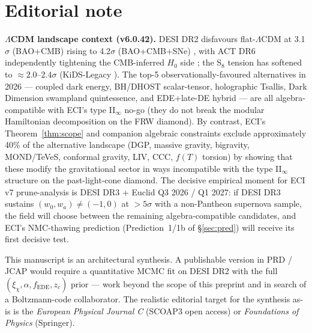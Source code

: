 \documentclass[reprint,amsmath,amssymb,aps,prd,superscriptaddress]{revtex4-2}
\providecommand{\1}{\mathbf{1}}
\begin{document}
\begin{enumerate}
\end{enumerate}

\section{Editorial note}

\noindent\textbf{$\Lambda$CDM landscape context (v6.0.42).}
DESI DR2 disfavours flat-$\Lambda$CDM at 3.1$\sigma$ (BAO+CMB) rising to 4.2$\sigma$ (BAO+CMB+SNe) \cite{DESIDR2}, with ACT DR6 independently tightening the CMB-inferred $H_0$ side \cite{Calabrese2025}; the S$_8$ tension has softened to $\approx 2.0$--$2.4\sigma$ (KiDS-Legacy \cite{KiDS2025}). The top-5 observationally-favoured alternatives in 2026 --- coupled dark energy, BH/DHOST scalar-tensor, holographic Tsallis, Dark Dimension swampland quintessence, and EDE+late-DE hybrid --- are all algebra-compatible with ECI's type II$_\infty$ no-go (they do not break the modular Hamiltonian decomposition on the FRW diamond). By contrast, ECI's Theorem~\ref{thm:scope} and companion algebraic constraints exclude approximately 40\% of the alternative landscape (DGP, massive gravity, bigravity, MOND/TeVeS, conformal gravity, LIV, CCC, $f(T)$ torsion) by showing that these modify the gravitational sector in ways incompatible with the type II$_\infty$ structure on the past-light-cone diamond. The decisive empirical moment for ECI v7 prune-analysis is DESI DR3 + Euclid Q3 2026 / Q1 2027: if DESI DR3 sustains $(w_0, w_a) \neq (-1, 0)$ at $>5\sigma$ with a non-Pantheon supernova sample, the field will choose between the remaining algebra-compatible candidates, and ECI's NMC-thawing prediction (Prediction~1/1b of \S\ref{sec:pred}) will receive its first decisive test.

\medskip
This manuscript is an architectural synthesis. A publishable version in PRD / JCAP would require a quantitative MCMC fit on DESI DR2 with the full $(\xi_\chi, \alpha, f_{\mathrm{EDE}}, z_c)$ prior --- work beyond the scope of this preprint and in search of a Boltzmann-code collaborator. The realistic editorial target for the synthesis as-is is the \emph{European Physical Journal C} (SCOAP3 open access) or \emph{Foundations of Physics} (Springer).
\end{document}
